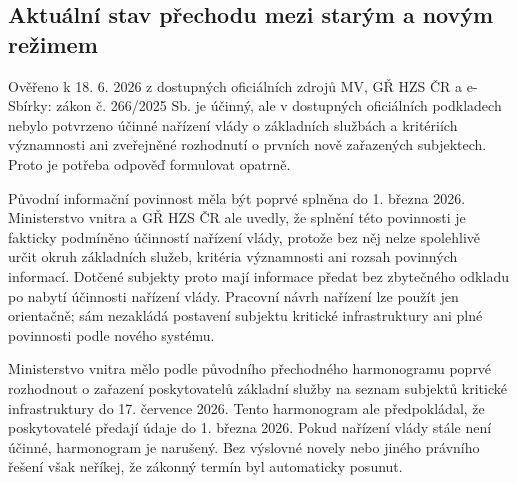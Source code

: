 \subsection*{Aktuální stav přechodu mezi starým a novým režimem}
Ověřeno k 18. 6. 2026 z dostupných oficiálních zdrojů MV, GŘ HZS ČR a e-Sbírky: zákon č. 266/2025 Sb. je účinný, ale v dostupných oficiálních podkladech nebylo potvrzeno účinné nařízení vlády o základních službách a kritériích významnosti ani zveřejněné rozhodnutí o prvních nově zařazených subjektech. Proto je potřeba odpověď formulovat opatrně.

Původní informační povinnost měla být poprvé splněna do 1. března 2026. Ministerstvo vnitra a GŘ HZS ČR ale uvedly, že splnění této povinnosti je fakticky podmíněno účinností nařízení vlády, protože bez něj nelze spolehlivě určit okruh základních služeb, kritéria významnosti ani rozsah povinných informací. Dotčené subjekty proto mají informace předat bez zbytečného odkladu po nabytí účinnosti nařízení vlády. Pracovní návrh nařízení lze použít jen orientačně; sám nezakládá postavení subjektu kritické infrastruktury ani plné povinnosti podle nového systému.

Ministerstvo vnitra mělo podle původního přechodného harmonogramu poprvé rozhodnout o zařazení poskytovatelů základní služby na seznam subjektů kritické infrastruktury do 17. července 2026. Tento harmonogram ale předpokládal, že poskytovatelé předají údaje do 1. března 2026. Pokud nařízení vlády stále není účinné, harmonogram je narušený. Bez výslovné novely nebo jiného právního řešení však neříkej, že zákonný termín byl automaticky posunut.


